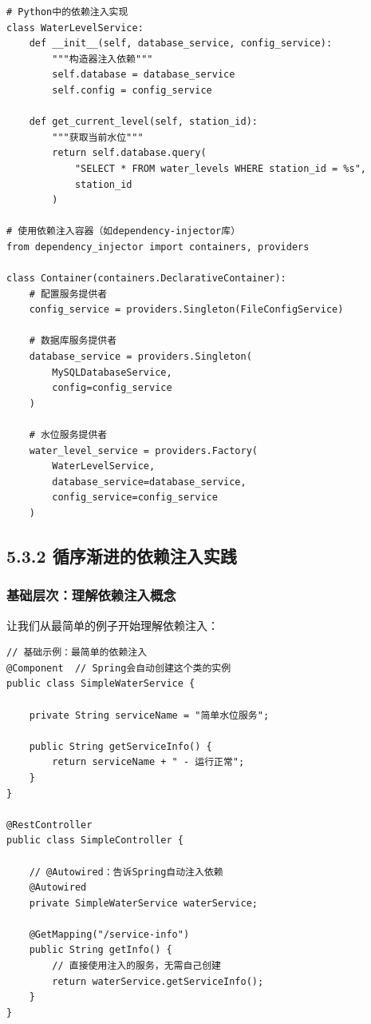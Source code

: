 \begin{lstlisting}[style=python]
# Python中的依赖注入实现
class WaterLevelService:
    def __init__(self, database_service, config_service):
        """构造器注入依赖"""
        self.database = database_service
        self.config = config_service
    
    def get_current_level(self, station_id):
        """获取当前水位"""
        return self.database.query(
            "SELECT * FROM water_levels WHERE station_id = %s", 
            station_id
        )

# 使用依赖注入容器（如dependency-injector库）
from dependency_injector import containers, providers

class Container(containers.DeclarativeContainer):
    # 配置服务提供者
    config_service = providers.Singleton(FileConfigService)
    
    # 数据库服务提供者
    database_service = providers.Singleton(
        MySQLDatabaseService,
        config=config_service
    )
    
    # 水位服务提供者
    water_level_service = providers.Factory(
        WaterLevelService,
        database_service=database_service,
        config_service=config_service
    )
\end{lstlisting}

\hypertarget{ux5faaux5e8fux6e10ux8fdbux7684ux4f9dux8d56ux6ce8ux5165ux5b9eux8df5}{%
\subsection{5.3.2 循序渐进的依赖注入实践}\label{ux5faaux5e8fux6e10ux8fdbux7684ux4f9dux8d56ux6ce8ux5165ux5b9eux8df5}}

\hypertarget{ux57faux7840ux5c42ux6b21ux7406ux89e3ux4f9dux8d56ux6ce8ux5165ux6982ux5ff5}{%
\subsubsection{基础层次：理解依赖注入概念}\label{ux57faux7840ux5c42ux6b21ux7406ux89e3ux4f9dux8d56ux6ce8ux5165ux6982ux5ff5}}

让我们从最简单的例子开始理解依赖注入：

\begin{lstlisting}[style=java]
// 基础示例：最简单的依赖注入
@Component  // Spring会自动创建这个类的实例
public class SimpleWaterService {
    
    private String serviceName = "简单水位服务";
    
    public String getServiceInfo() {
        return serviceName + " - 运行正常";
    }
}

@RestController
public class SimpleController {
    
    // @Autowired：告诉Spring自动注入依赖
    @Autowired
    private SimpleWaterService waterService;
    
    @GetMapping("/service-info")
    public String getInfo() {
        // 直接使用注入的服务，无需自己创建
        return waterService.getServiceInfo();
    }
}
\end{lstlisting}


